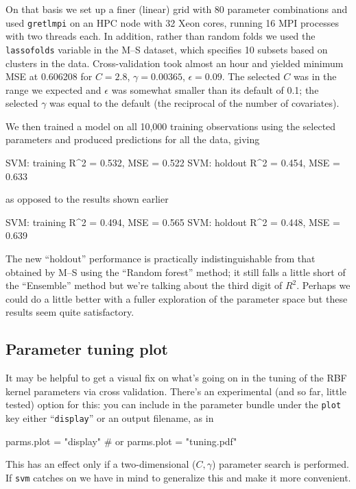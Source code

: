 \documentclass{article}
\begin{document}
On that basis we set up a finer (linear) grid with 80 parameter
combinations and used \texttt{gretlmpi} on an HPC node with 32 Xeon
cores, running 16 MPI processes with two threads each. In addition,
rather than random folds we used the \texttt{lassofolds} variable in
the M--S dataset, which specifies 10 subsets based on clusters in the
data. Cross-validation took almost an hour and yielded minimum MSE at
0.606208 for $C=2.8$, $\gamma=0.00365$, $\epsilon=0.09$. The selected
$C$ was in the range we expected and $\epsilon$ was somewhat smaller
than its default of 0.1; the selected $\gamma$ was equal to the
default (the reciprocal of the number of covariates).

We then trained a model on all 10,000 training observations using the
selected parameters and produced predictions for all the data, giving
\begin{code}
SVM: training R^2 = 0.532, MSE = 0.522
SVM: holdout  R^2 = 0.454, MSE = 0.633
\end{code}
as opposed to the results shown earlier
\begin{code}
SVM: training R^2 = 0.494, MSE = 0.565
SVM: holdout  R^2 = 0.448, MSE = 0.639
\end{code}
The new ``holdout'' performance is practically indistinguishable from
that obtained by M--S using the ``Random forest'' method; it still falls
a little short of the ``Ensemble'' method but we're talking about the
third digit of $R^2$. Perhaps we could do a little better with a
fuller exploration of the parameter space but these results seem
quite satisfactory.

\subsection{Parameter tuning plot}
\label{sec:plot}

It may be helpful to get a visual fix on what's going on in the tuning
of the RBF kernel parameters via cross validation. There's an
experimental (and so far, little tested) option for this: you can
include in the parameter bundle under the \texttt{plot} key either
``\texttt{display}'' or an output filename, as in
\begin{code}
parms.plot = "display"
# or
parms.plot = "tuning.pdf"
\end{code}
This has an effect only if a two-dimensional ($C, \gamma$) parameter
search is performed. If \texttt{svm} catches on we have in mind to
generalize this and make it more convenient.
\end{document}
